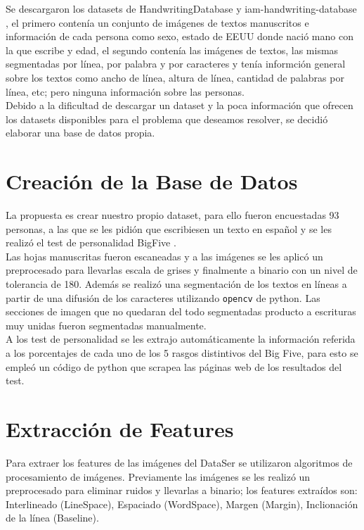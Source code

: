 \documentclass[10pt, a4paper]{article}
\begin{document}
Se descargaron los datasets de HandwritingDatabase \cite{15} y iam-handwriting-database \cite{16}, el primero conten\'ia un conjunto de im\'agenes de textos manuscritos e informaci\'on de cada persona como sexo, estado de EEUU donde naci\'o 
mano con la que escribe y edad, el segundo conten\'ia las im\'agenes de textos, las mismas segmentadas por l\'inea, por palabra y por caracteres y ten\'ia informci\'on general sobre los textos como 
ancho de l\'inea, altura de l\'inea, cantidad de palabras por l\'inea, etc; pero ninguna informaci\'on sobre las personas. \\ 

Debido a la dificultad de descargar un dataset y la poca informaci\'on que ofrecen los datasets disponibles para el problema que deseamos resolver, se decidi\'o elaborar una base de datos propia.

\section{Creaci\'on de la Base de Datos}

La propuesta es crear nuestro propio dataset, para ello fueron encuestadas 93 personas, a las que se les pidi\'on que escribiesen un texto 
en espa\~nol y se les realiz\'o el test de personalidad BigFive \cite{23}. \\ 

Las hojas manuscritas fueron escaneadas y a las im\'agenes se les aplic\'o un preprocesado para llevarlas escala de grises y finalmente a binario con un nivel de tolerancia de 180. Adem\'as se 
realiz\'o una segmentaci\'on de los textos en l\'ineas a partir de una difusi\'on de los caracteres utilizando \texttt{opencv} de python. Las secciones de imagen que no quedaran 
del todo segmentadas producto a escrituras muy unidas fueron segmentadas manualmente.\\ 

A los test de personalidad se les extrajo autom\'aticamente la informaci\'on referida a los porcentajes de cada uno 
de los 5 rasgos distintivos del Big Five, para esto se emple\'o un c\'odigo de python que scrapea las p\'aginas web de los resultados del test.\\ 

\section{Extracci\'on de Features}
Para extraer los features de las im\'agenes del DataSer se utilizaron algoritmos de procesamiento de im\'agenes. Previamente las im\'agenes se les realiz\'o un 
preprocesado para eliminar ruidos y llevarlas a binario; los features extra\'idos son: Interlineado (LineSpace), Espaciado (WordSpace), Margen (Margin), Inclionaci\'on de la l\'inea (Baseline). 
\end{document}
